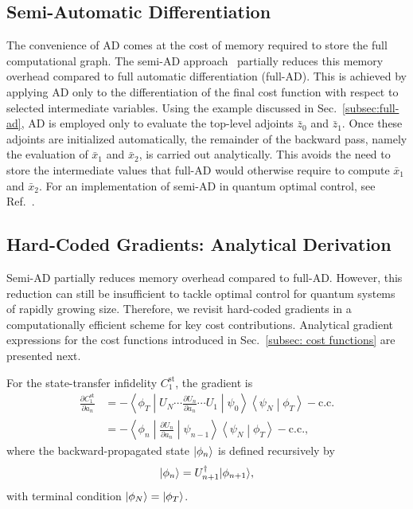 \subsection{Semi-Automatic Differentiation}
\label{subsec:semi-ad}
The convenience of AD comes at the cost of memory required to store the full computational graph. The semi-AD approach~\cite{semiadgoerz2022quantum} partially reduces this memory overhead compared to full automatic differentiation (full-AD). This is achieved by applying AD only to the differentiation of the final cost function with respect to selected intermediate variables. Using the example discussed in Sec.~\ref{subsec:full-ad}, AD is employed only to evaluate the top-level adjoints \(\bar z_0\) and \(\bar z_1\). Once these adjoints are initialized automatically, the remainder of the backward pass, namely the evaluation of \(\bar x_1\) and \(\bar x_2\), is carried out analytically. This avoids the need to store the intermediate values that full-AD would otherwise require to compute \(\bar x_1\) and \(\bar x_2\). For an implementation of semi-AD in quantum optimal control, see Ref.~\cite{semiadgoerz2022quantum}.\

\subsection{Hard-Coded Gradients: Analytical Derivation}
\label{subsec:hard-coded-gradients}
Semi-AD partially reduces memory overhead compared to full-AD. However, this reduction can still be insufficient to tackle optimal
control for quantum systems of rapidly growing size. Therefore, we revisit hard-coded gradients
in a computationally efficient scheme for key cost contributions.
Analytical gradient expressions for the cost functions introduced in Sec.\ \ref{subsec: cost functions} are presented next.

For the state-transfer infidelity $C_1^{\mathrm{st}}$, the gradient is
\begin{align}
\label{stgradient}
\frac{\partial C_1^{\mathrm{st}}}{\partial a_n}
&=
-\left\langle \phi_T \middle| U_N\cdots \frac{\partial U_n}{\partial a_n}\cdots U_1 \middle| \psi_0 \right\rangle
\left\langle \psi_N \middle| \phi_T \right\rangle
-\mathrm{c.c.}
\nonumber\\
&=
-\left\langle \phi_n \middle| \frac{\partial U_n}{\partial a_n} \middle| \psi_{n-1} \right\rangle
\left\langle \psi_N \middle| \phi_T \right\rangle
-\mathrm{c.c.},
\end{align}
where the backward-propagated state $|\phi_n\rangle$ is defined recursively by
\begin{equation}
|\phi_n\rangle=U_{n+1}^\dagger |\phi_{n+1}\rangle,
\end{equation}
with terminal condition $|\phi_N\rangle=|\phi_T\rangle$.

